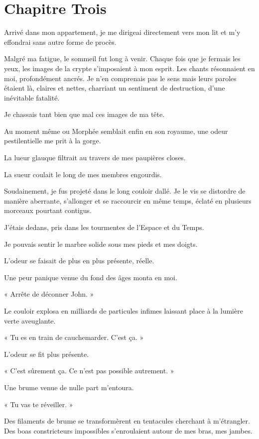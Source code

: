 \chapter[Chapitre Trois]{Chapitre Trois}
Arrivé dans mon appartement, je me dirigeai directement vers mon lit et m'y effondrai sans autre forme de procès.

Malgré ma fatigue, le sommeil fut long à venir. Chaque fois que je fermais les yeux, les images de la crypte 
s'imposaient à mon esprit. Les chants résonnaient en moi, profondément ancrés. Je n'en comprenais pas le sens mais 
leurs paroles étaient là, claires et nettes, charriant un sentiment de destruction, d'une inévitable fatalité.

Je chassais tant bien que mal ces images de ma tête.

Au moment même ou Morphée semblait enfin en son royaume, une odeur pestilentielle me prit à la gorge.

La lueur glauque filtrait au travers de mes paupières closes. 

La sueur coulait le long de mes membres engourdis.

Soudainement, je fus projeté dans le long couloir dallé. Je le vis se distordre de manière aberrante, s'allonger et se 
raccourcir en même temps, éclaté en plusieurs morceaux pourtant contigus.

J'étais dedans, pris dans les tourmentes de l'Espace et du Temps.

Je pouvais sentir le marbre solide sous mes pieds et mes doigts.

L'odeur se faisait de plus en plus présente, réelle.

Une peur panique venue du fond des âges monta en moi.

« Arrête de déconner John. »

Le couloir explosa en milliards de particules infimes laissant place à la lumière verte aveuglante.

« Tu es en train de cauchemarder. C'est ça. »

L'odeur se fit plus présente.

« C'est sûrement ça. Ce n'est pas possible autrement. »

Une brume venue de nulle part m'entoura.

« Tu vas te réveiller. » 

Des filaments de brume se transformèrent en tentacules cherchant à m'étrangler. Des boas constricteurs impossibles 
s'enroulaient autour de mes bras, mes jambes.

